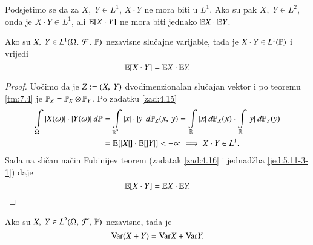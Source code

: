 Podsjetimo se da za $X, \; Y \in L^1$, $X \cdot Y$ ne mora biti u $L^1$. Ako su pak $X, \; Y \in L^2$, onda je $X \cdot Y \in L^1$, ali $\mathbb{E} [X \cdot Y]$ ne mora biti jednako $\mathbb{E} X \cdot \mathbb{E} Y$.

\begin{tm}  \label{tm:7.7}
    Ako su $X, \; Y \in L^1 (\Omega, \: \mathcal{F}, \: \mathbb{P})$ nezavisne slu\v cajne varijable, tada je $X \cdot Y \in L^1(\mathbb{P})$ i vrijedi
    \begin{equation*}
        \mathbb{E} [X \cdot Y] = \mathbb{E} X \cdot \mathbb{E} Y.
    \end{equation*}
\end{tm}

\begin{proof}
    Uo\v cimo da je $Z:=({X}, \: {Y})$ dvodimenzionalan slu\v cajan vektor i po teoremu \ref{tm:7.4} je $\mathbb{P}_Z = \mathbb{P}_X \otimes \mathbb{P}_Y$.
    Po zadatku \ref{zad:4.15}
    \begin{align*}
        \int\limits_\Omega |X(\omega)| \cdot |Y(\omega)| \: d \mathbb{P}
        &= \int\limits_{\mathbb{R}^2} |x| \cdot |y| \: d \mathbb{P}_Z ({x}, \: {y}) = \int\limits_{\mathbb{R}} |x| \: d \mathbb{P}_X (x) \cdot \int\limits_{\mathbb{R}} |y| \: d \mathbb{P}_Y (y)\\
        &= \mathbb{E} [|X|] \cdot \mathbb{E} [|Y|] < +\infty \implies X \cdot Y \in L^1.
    \end{align*}
    Sada na sli\v can na\v cin Fubinijev teorem (zadatak \ref{zad:4.16} i jednad\v zba \ref{jed:5.11-3-1}) daje
    \begin{equation*}
        \mathbb{E} [X \cdot Y] = \mathbb{E} X \cdot \mathbb{E} Y.
    \end{equation*}
\end{proof}

\begin{zad} \label{zad:7.8}
    Ako su $X, \; Y \in L^2 (\Omega, \: \mathcal{F}, \: \mathbb{P})$ nezavisne, tada je
    \begin{equation*}
        \mathrm{Var} (X + Y) = \mathrm{Var} X + \mathrm{Var} Y.
    \end{equation*}
\end{zad}

